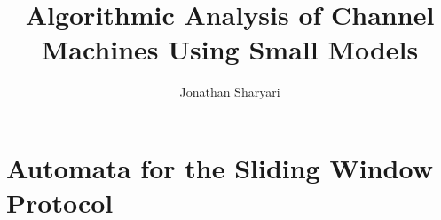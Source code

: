 \documentclass[a4paper,12pt]{article}
\title{\textbf{Algorithmic Analysis of Channel Machines Using Small Models}}
\author{Jonathan Sharyari}
\begin{document}
\maketitle



\newpage
\tableofcontents
\newpage

%
\newpage

\newpage
%

%
\newpage

\newpage

\newpage

\newpage




\newpage


\newpage


\appendix
\section{Automata for the Sliding Window Protocol}
\label{SWgraph}
\end{document}
